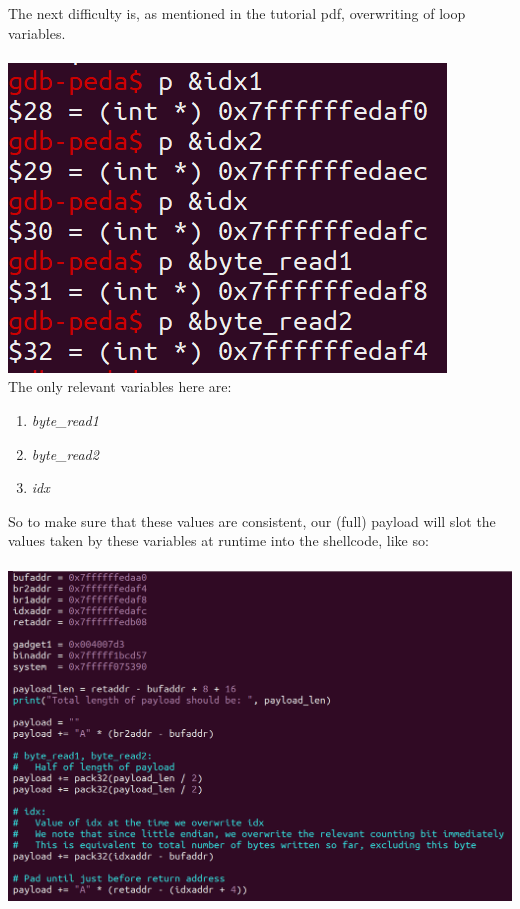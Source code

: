 \documentclass[12pt]{article}
\begin{document}
The next difficulty is, as mentioned in the tutorial pdf, overwriting of loop variables.\\\\
\includegraphics[scale=0.7]{./a2/buffer_overflow/extravariables.PNG}\\

The only relevant variables here are:
\begin{enumerate}
    \item \emph{byte\_read1}
    \item \emph{byte\_read2}
    \item \emph{idx}
\end{enumerate}
So to make sure that these values are consistent, our (full) payload will slot the values taken by these variables at runtime into the shellcode, like so:\\\\
\includegraphics[scale=0.5]{./a2/buffer_overflow/extravariablesexploit.PNG}\\
\end{document}
